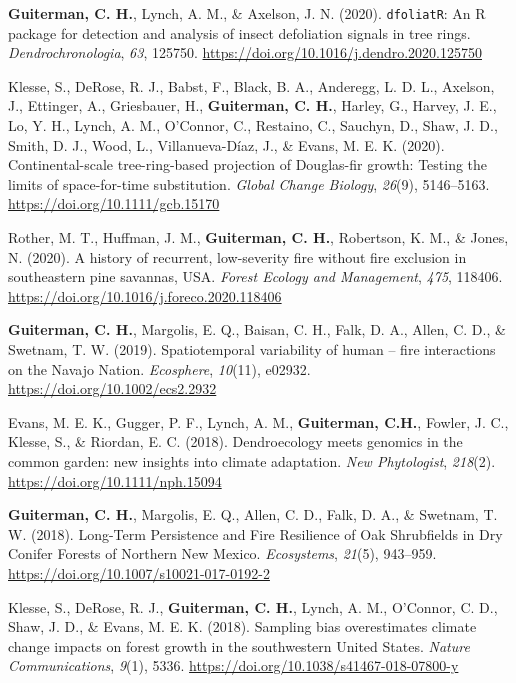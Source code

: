 \documentclass[11pt,a4paper,]{moderncv}
\begin{document}
\leavevmode\hypertarget{ref-Guiterman2020}{}%
\textbf{Guiterman, C. H.}, Lynch, A. M., \& Axelson, J. N. (2020).
\texttt{dfoliatR}: An R package for detection and analysis of insect
defoliation signals in tree rings. \emph{Dendrochronologia}, \emph{63},
125750. \url{https://doi.org/10.1016/j.dendro.2020.125750}

\leavevmode\hypertarget{ref-Klesse2020}{}%
Klesse, S., DeRose, R. J., Babst, F., Black, B. A., Anderegg, L. D. L.,
Axelson, J., Ettinger, A., Griesbauer, H., \textbf{Guiterman, C. H.},
Harley, G., Harvey, J. E., Lo, Y. H., Lynch, A. M., O'Connor, C.,
Restaino, C., Sauchyn, D., Shaw, J. D., Smith, D. J., Wood, L.,
Villanueva-Díaz, J., \& Evans, M. E. K. (2020). Continental-scale
tree-ring-based projection of Douglas-fir growth: Testing the limits of
space-for-time substitution. \emph{Global Change Biology}, \emph{26}(9),
5146--5163. \url{https://doi.org/10.1111/gcb.15170}

\leavevmode\hypertarget{ref-Rother2020}{}%
Rother, M. T., Huffman, J. M., \textbf{Guiterman, C. H.}, Robertson, K.
M., \& Jones, N. (2020). A history of recurrent, low-severity fire
without fire exclusion in southeastern pine savannas, USA. \emph{Forest
Ecology and Management}, \emph{475}, 118406.
\url{https://doi.org/10.1016/j.foreco.2020.118406}

\leavevmode\hypertarget{ref-Guiterman2019}{}%
\textbf{Guiterman, C. H.}, Margolis, E. Q., Baisan, C. H., Falk, D. A.,
Allen, C. D., \& Swetnam, T. W. (2019). Spatiotemporal variability of
human -- fire interactions on the Navajo Nation. \emph{Ecosphere},
\emph{10}(11), e02932. \url{https://doi.org/10.1002/ecs2.2932}

\leavevmode\hypertarget{ref-Evans2018}{}%
Evans, M. E. K., Gugger, P. F., Lynch, A. M., \textbf{Guiterman, C.H.},
Fowler, J. C., Klesse, S., \& Riordan, E. C. (2018). Dendroecology meets
genomics in the common garden: new insights into climate adaptation.
\emph{New Phytologist}, \emph{218}(2).
\url{https://doi.org/10.1111/nph.15094}

\leavevmode\hypertarget{ref-Guiterman2018}{}%
\textbf{Guiterman, C. H.}, Margolis, E. Q., Allen, C. D., Falk, D. A.,
\& Swetnam, T. W. (2018). Long-Term Persistence and Fire Resilience of
Oak Shrubfields in Dry Conifer Forests of Northern New Mexico.
\emph{Ecosystems}, \emph{21}(5), 943--959.
\url{https://doi.org/10.1007/s10021-017-0192-2}

\leavevmode\hypertarget{ref-Klesse2018}{}%
Klesse, S., DeRose, R. J., \textbf{Guiterman, C. H.}, Lynch, A. M.,
O'Connor, C. D., Shaw, J. D., \& Evans, M. E. K. (2018). Sampling bias
overestimates climate change impacts on forest growth in the
southwestern United States. \emph{Nature Communications}, \emph{9}(1),
5336. \url{https://doi.org/10.1038/s41467-018-07800-y}
\end{document}
